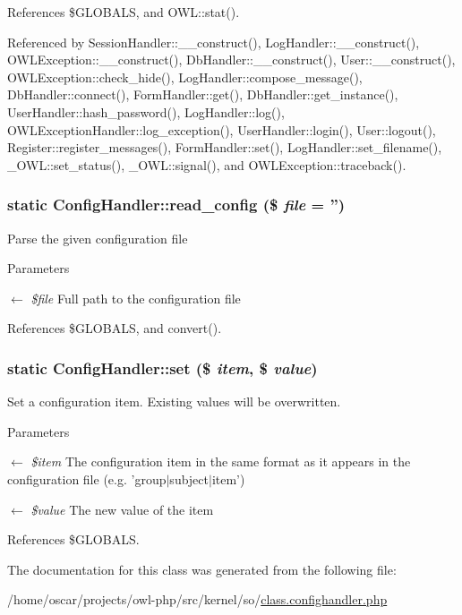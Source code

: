 References \$GLOBALS, and OWL::stat().



Referenced by SessionHandler::\_\-\_\-construct(), LogHandler::\_\-\_\-construct(), OWLException::\_\-\_\-construct(), DbHandler::\_\-\_\-construct(), User::\_\-\_\-construct(), OWLException::check\_\-hide(), LogHandler::compose\_\-message(), DbHandler::connect(), FormHandler::get(), DbHandler::get\_\-instance(), UserHandler::hash\_\-password(), LogHandler::log(), OWLExceptionHandler::log\_\-exception(), UserHandler::login(), User::logout(), Register::register\_\-messages(), FormHandler::set(), LogHandler::set\_\-filename(), \_\-OWL::set\_\-status(), \_\-OWL::signal(), and OWLException::traceback().

\subsubsection[{read\_\-config}]{\setlength{\rightskip}{0pt plus 5cm}static ConfigHandler::read\_\-config (\$ {\em file} = {\ttfamily ''})}\label{classConfigHandler_af61ee6f9f793e4cd0128c02e4e28bf90}
Parse the given configuration file


\begin{DoxyParams}{Parameters}
\item[\mbox{$\leftarrow$} {\em \$file}]Full path to the configuration file \end{DoxyParams}


References \$GLOBALS, and convert().

\subsubsection[{set}]{\setlength{\rightskip}{0pt plus 5cm}static ConfigHandler::set (\$ {\em item}, \/  \$ {\em value})}\label{classConfigHandler_a82c10cf53f06169cee0bdc0716bc089a}
Set a configuration item. Existing values will be overwritten.


\begin{DoxyParams}{Parameters}
\item[\mbox{$\leftarrow$} {\em \$item}]The configuration item in the same format as it appears in the configuration file (e.g. 'group$|$subject$|$item') \item[\mbox{$\leftarrow$} {\em \$value}]The new value of the item \end{DoxyParams}


References \$GLOBALS.



The documentation for this class was generated from the following file:\begin{DoxyCompactItemize}
\item 
/home/oscar/projects/owl-\/php/src/kernel/so/\hyperlink{class_8confighandler_8php}{class.confighandler.php}\end{DoxyCompactItemize}
